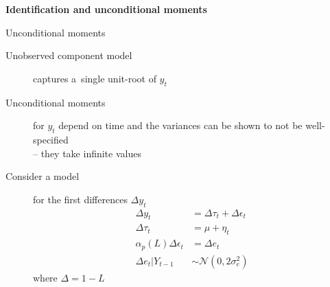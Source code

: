\documentclass[notes,blackandwhite,mathsans,usenames,dvipsnames]{beamer}
\begin{document}
{
\begin{frame}

\begin{adjustwidth}{-0.5cm}{0cm}
\vspace{8.3cm}\Large
\textbf{{\color{lightgray}Identification and} {\color{mcxs1}unconditional moments}}
\end{adjustwidth}

\end{frame}
}





\begin{frame}{Unconditional moments}

\begin{description}
\item[Unobserved component model] {\color{mcxs2}captures a~single unit-root of} $y_t$
\item[Unconditional moments] {\color{mcxs2}for} $y_t$ {\color{mcxs2}depend on time and the variances can be shown to not be well-specified\\ -- they take infinite values}
\item[Consider a model] {\color{mcxs2}for the first differences} $\Delta y_t$
\begin{align*}
\Delta y_t &= \Delta \tau_t + \Delta \epsilon_t\\[1ex]
\Delta \tau_t &= \mu + \eta_t\\[1ex]
\alpha_p(L)\Delta \epsilon_t &= \Delta e_t\\[1ex]
\Delta e_t|Y_{t-1}&\sim\mathcal{N}\left(0,2\sigma_e^2\right)
\end{align*}
{\color{mcxs2}where} $\Delta=1-L$
\end{description}

\end{frame}
\end{document}
